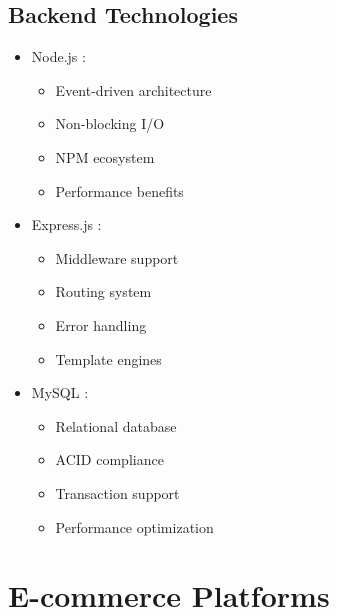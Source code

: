 \subsection{Backend Technologies}
\begin{itemize}
    \item Node.js \cite{nodejs}:
    \begin{itemize}
        \item Event-driven architecture
        \item Non-blocking I/O
        \item NPM ecosystem
        \item Performance benefits
    \end{itemize}
    \item Express.js \cite{expressjs}:
    \begin{itemize}
        \item Middleware support
        \item Routing system
        \item Error handling
        \item Template engines
    \end{itemize}
    \item MySQL \cite{mysql}:
    \begin{itemize}
        \item Relational database
        \item ACID compliance
        \item Transaction support
        \item Performance optimization
    \end{itemize}
\end{itemize}

\section{E-commerce Platforms}
